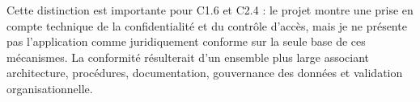 Cette distinction est importante pour C1.6 et C2.4 : le projet montre une prise en compte technique de la confidentialité et du contrôle d'accès, mais je ne présente pas l'application comme juridiquement conforme sur la seule base de ces mécanismes. La conformité résulterait d'un ensemble plus large associant architecture, procédures, documentation, gouvernance des données et validation organisationnelle.